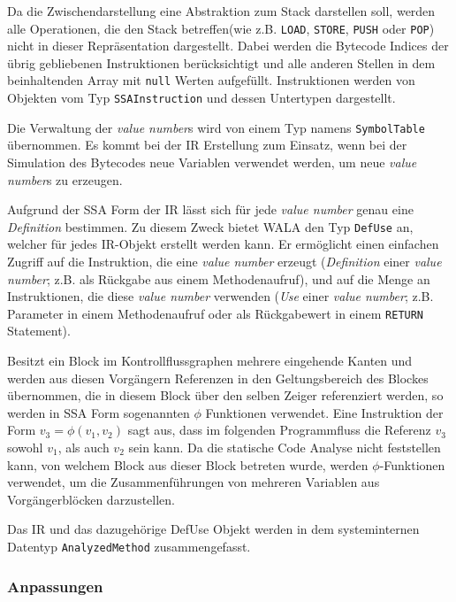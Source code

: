 Da die Zwischendarstellung eine Abstraktion zum Stack darstellen soll, werden alle Operationen, 
die den Stack betreffen(wie z.B. \texttt{LOAD}, \texttt{STORE}, \texttt{PUSH} oder \texttt{POP}) 
nicht in dieser Repräsentation dargestellt. Dabei werden die Bytecode Indices der übrig gebliebenen 
Instruktionen berücksichtigt und alle anderen Stellen in dem beinhaltenden Array mit \texttt{null} 
Werten aufgefüllt. Instruktionen werden von Objekten vom Typ \texttt{SSAInstruction} und dessen 
Untertypen dargestellt.

Die Verwaltung der \textit{value number}s wird von einem Typ namens \texttt{SymbolTable} übernommen. Es kommt bei der
IR Erstellung zum Einsatz, wenn bei der Simulation des Bytecodes neue Variablen verwendet werden, um neue 
\textit{value number}s zu erzeugen.

Aufgrund der SSA Form der IR lässt sich für jede \textit{value number} genau eine \textit{Definition} bestimmen. Zu diesem 
Zweck bietet WALA den Typ \texttt{DefUse} an, welcher für jedes IR-Objekt erstellt werden kann. Er ermöglicht
einen einfachen Zugriff auf die Instruktion, die eine \textit{value number} erzeugt (\textit{Definition} 
einer \textit{value number}; z.B. als Rückgabe aus einem Methodenaufruf), und auf die Menge an Instruktionen, die 
diese \textit{value number} verwenden (\textit{Use} einer \textit{value number}; z.B. Parameter in einem Methodenaufruf 
oder als Rückgabewert in einem \texttt{RETURN} Statement).

Besitzt ein Block im Kontrollflussgraphen mehrere eingehende Kanten und werden aus diesen Vorgängern 
Referenzen in den Geltungsbereich des Blockes übernommen, die in diesem Block über den selben Zeiger 
referenziert werden, so werden in SSA Form sogenannten $\phi$ Funktionen verwendet. Eine Instruktion 
der Form $v_3 = \phi(v_1, v_2)$ sagt aus, dass im folgenden Programmfluss die Referenz $v_3$ sowohl $v_1$, als 
auch $v_2$ sein kann. Da die statische Code Analyse nicht feststellen kann, von welchem Block aus dieser 
Block betreten wurde, werden $\phi$-Funktionen verwendet, um die Zusammenführungen von mehreren 
Variablen aus Vorgängerblöcken darzustellen.

Das IR und das dazugehörige DefUse Objekt werden in dem systeminternen Datentyp \texttt{AnalyzedMethod} 
zusammengefasst.

\subsubsection{Anpassungen}

